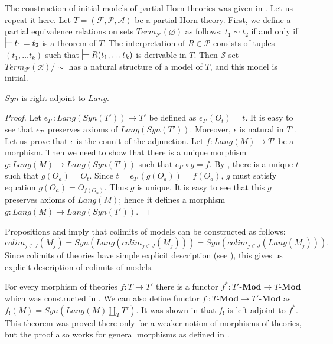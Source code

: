 \documentclass[reqno]{amsart}
\theoremstyle{definition}
\theoremstyle{remark}
\newcommand{\cat}[1]{\mathbf{#1}}
\newcommand{\Mod}[1]{#1\text{-}\cat{Mod}}
\numberwithin{figure}{section}
\begin{document}
The construction of initial models of partial Horn theories was given in \cite{PHL}.
Let us repeat it here.
Let $T = (\mathcal{F},\mathcal{P},\mathcal{A})$ be a partial Horn theory.
First, we define a partial equivalence relations on sets $Term_\mathcal{F}(\varnothing)$ as follows:
$t_1 \sim t_2$ if and only if $\sststile{}{} t_1 = t_2$ is a theorem of $T$.
The interpretation of $R \in \mathcal{P}$ consists of tuples $(t_1, \ldots t_k)$ such that $\sststile{}{} R(t_1, \ldots t_k)$ is derivable in $T$.
Then $\mathcal{S}$-set $Term_\mathcal{F}(\varnothing)/\!\sim$ has a natural structure of a model of $T$, and this model is initial.

\begin{prop}
$Syn$ is right adjoint to $Lang$.
\end{prop}
\begin{proof}
Let $\epsilon_{T'} : Lang(Syn(T')) \to T'$ be defined as $\epsilon_{T'}(O_t) = t$.
It is easy to see that $\epsilon_{T'}$ preserves axioms of $Lang(Syn(T'))$.
Moreover, $\epsilon$ is natural in $T'$.
Let us prove that $\epsilon$ is the counit of the adjunction.
Let $f : Lang(M) \to T'$ be a morphism.
Then we need to show that there is a unique morphism $g : Lang(M) \to Lang(Syn(T'))$ such that $\epsilon_{T'} \circ g = f$.
By , there is a unique $t$ such that $g(O_a) = O_t$.
Since $t = \epsilon_{T'}(g(O_a)) = f(O_a)$, $g$ must satisfy equation $g(O_a) = O_{f(O_a)}$.
Thus $g$ is unique.
It is easy to see that this $g$ preserves axioms of $Lang(M)$; hence it defines a morphism $g : Lang(M) \to Lang(Syn(T'))$.
\end{proof}

\begin{rem}[colimits]
Propositions  and  imply that colimits of models can be constructed as follows:
\[ colim_{j \in J}(M_j) = Syn(Lang(colim_{j \in J}(M_j))) = Syn(colim_{j \in J}(Lang(M_j))). \]
Since colimits of theories have simple explicit description (see \cite{alg-tt}), this gives us explicit description of colimits of models.
\end{rem}

For every morphism of theories $f : T \to T'$ there is a functor $f^* : \Mod{T'} \to \Mod{T}$ which was constructed in \cite{alg-tt}.
We can also define functor $f_! : \Mod{T} \to \Mod{T'}$ as $f_!(M) = Syn(Lang(M) \amalg_{T} T')$.
It was shown in \cite{PHL} that $f_!$ is left adjoint to $f^*$.
This theorem was proved there only for a weaker notion of morphisms of theories, but the proof also works for general morphisms as defined in \cite{alg-tt}.
\end{document}
